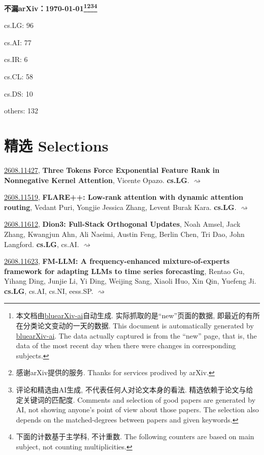 \documentclass[9pt, a4paper]{article}
\theoremstyle{plain}
\theoremstyle{definition}
\theoremstyle{remark}
\newcommand{\arxiv}[3]{\href{https://arxiv.org/abs/#1}{#1}, \textbf{\textcolor{arxivblue}{#2}}, #3. }
\begin{document}
\begin{center}
    \Huge\textbf{不漏arXiv：\today \footnote{本文档由\href{https://github.com/vegetablefj/bluearXiv-ai}{bluearXiv-ai}自动生成. 实际抓取的是``new''页面的数据, 即最近的有所在分类论文变动的一天的数据. This document is automatically generated by \href{https://github.com/vegetablefj/bluearXiv-ai}{bluearXiv-ai}. The data actually captured is from the ``new'' page, that is, the data of the most recent day when there were changes in corresponding subjects.}\footnote{感谢arXiv提供的服务. Thanks for services prodived by arXiv.}\footnote{评论和精选由AI生成, 不代表任何人对论文本身的看法. 精选依赖于论文与给定关键词的匹配度. Comments and selection of good papers are generated by AI, not showing anyone's point of view about those papers. The selection also depends on the matched-degrees between papers and given keywords.}\footnote{下面的计数基于主学科, 不计重数. The following counters are based on main subject, not counting multiplicities.}} 
\end{center}

\begin{center}
cs.LG: 96

cs.AI: 77

cs.IR: 6

cs.CL: 58

cs.DS: 10

others: 132

\end{center}

\setcounter{section}{-1}
\section{精选 Selections}
\arxiv{2608.11427}{Three Tokens Force Exponential Feature Rank in Nonnegative Kernel Attention}{Vicente Opazo}\textbf{cs.LG}. \hyperlink{2608.11427}{$\rightsquigarrow$}

\arxiv{2608.11519}{FLARE++: Low-rank attention with dynamic attention routing}{Vedant Puri, Yongjie Jessica Zhang, Levent Burak Kara}\textbf{cs.LG}. \hyperlink{2608.11519}{$\rightsquigarrow$}

\arxiv{2608.11612}{Dion3: Full-Stack Orthogonal Updates}{Noah Amsel, Jack Zhang, Kwangjun Ahn, Ali Naeimi, Austin Feng, Berlin Chen, Tri Dao, John Langford}\textbf{cs.LG}, cs.AI. \hyperlink{2608.11612}{$\rightsquigarrow$}

\arxiv{2608.11623}{FM-LLM: A frequency-enhanced mixture-of-experts framework for adapting LLMs to time series forecasting}{Rentao Gu, Yihang Ding, Junjie Li, Yi Ding, Weijing Sang, Xiaoli Huo, Xin Qin, Yuefeng Ji}\textbf{cs.LG}, cs.AI, cs.NI, eess.SP. \hyperlink{2608.11623}{$\rightsquigarrow$}
\end{document}
